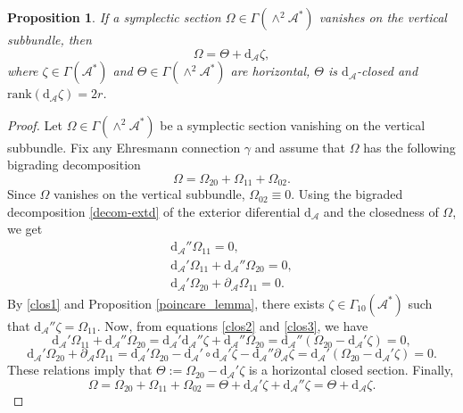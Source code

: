 \documentclass[12pt,letterpaper]{article}
\newtheorem{proposition}[theorem]{Proposition}
\numberwithin{equation}{section}
\begin{document}
\begin{proposition}\label{prop1}
If a symplectic section $\Omega \in \Gamma(\wedge^2 \mathscr{A}^* ) $ vanishes on the vertical subbundle, then
\begin{equation}
\Omega = \Theta + \mathrm{ d}_{\mathscr{A}} \zeta, 
\end{equation}
where $\zeta\in\Gamma(\mathscr{A}^*)$ and $\Theta\in\Gamma(\wedge^2 \mathscr{A}^*)$ are horizontal, $\Theta$ is $\mathrm{d}_{\mathscr{A}}$-closed and $\mathrm{rank}(\mathrm{d}_{\mathscr{A}} \zeta)=2r$.
\end{proposition}
\begin{proof}
Let $\Omega \in \Gamma(\wedge^2 \mathscr{A}^* ) $ be a symplectic section vanishing on the vertical subbundle. 
Fix any Ehresmann connection $\gamma$ and assume that $\Omega$ has the following bigrading decomposition
$$\Omega= \Omega_{20}+\Omega_{11} +\Omega_{02}.$$
Since $\Omega$ vanishes on the vertical subbundle, $\Omega_{02}\equiv 0$. Using the bigraded decomposition \eqref{decom-extd} of the exterior diferential $\mathrm{ d}_{\mathscr{A}} $ and the closedness of $\Omega$, we get
\begin{eqnarray}
\mathrm{ d}_{\mathscr{A}} '' \Omega_{11}=0, \label{clos1}\\
\mathrm{ d}_{\mathscr{A}} ' \Omega_{11}+ \mathrm{ d}_{\mathscr{A}} '' \Omega_{20}=0,\label{clos2}\\
\mathrm{ d}_{\mathscr{A}} ' \Omega_{20}+\partial_\mathscr{A} \Omega_{11} =0.\label{clos3}
\end{eqnarray}
By \eqref{clos1} and Proposition \ref{poincare_lemma}, there exists $\zeta \in\Gamma_{10}( \mathscr{A}^*)  $ such that
$ \mathrm{ d}_{\mathscr{A}} ''   \zeta =  \Omega_{11}$. 
Now, from equations \eqref{clos2} and \eqref{clos3},  we have 
$$\mathrm{ d}_{\mathscr{A}} ' \Omega_{11}+ \mathrm{ d}_{\mathscr{A}} '' \Omega_{20}= \mathrm{ d}_{\mathscr{A}} '  \mathrm{ d}_{\mathscr{A}} ''   \zeta+ \mathrm{ d}_{\mathscr{A}} '' \Omega_{20}=\mathrm{ d}_{\mathscr{A}} ''(\Omega_{20}- \mathrm{ d}_{\mathscr{A}} '  \zeta) =0,  $$
$$\mathrm{ d}_{\mathscr{A}} ' \Omega_{20}+\partial_\mathscr{A} \Omega_{11}= \mathrm{ d}_{\mathscr{A}} ' \Omega_{20}-\mathrm{ d}_{\mathscr{A}} '\circ\mathrm{ d}_{\mathscr{A}} '   \zeta -\mathrm{ d}_{\mathscr{A}} '' \partial_\mathscr{A}  \zeta   = \mathrm{ d}_{\mathscr{A}} '(\Omega_{20}- \mathrm{ d}_{\mathscr{A}} ' \zeta )  =0. $$
These relations imply that $\Theta:= \Omega_{20}- \mathrm{ d}_{\mathscr{A}} ' \zeta$ is a horizontal closed section.  
Finally,
$$\Omega= \Omega_{20}+\Omega_{11} +\Omega_{02}= \Theta+ \mathrm{ d}_{\mathscr{A}} ' \zeta+ \mathrm{ d}_{\mathscr{A}}''\zeta = \Theta + \mathrm{ d}_{\mathscr{A}} \zeta .$$
\end{proof}
\end{document}
